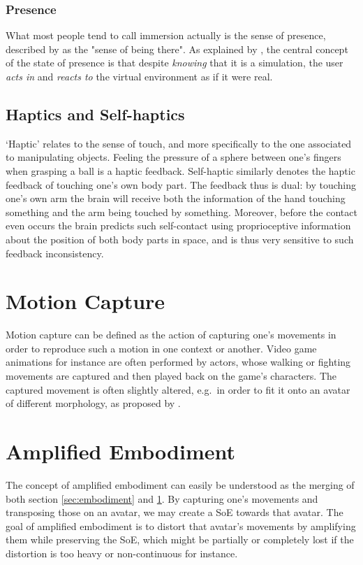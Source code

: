 \subsubsection{Presence}
What most people tend to call immersion actually is the sense of presence, described by \cite{held1992telepresence,slater1993representations} as the "sense of being there". As explained by \cite{debarba2017embodiment}, the central concept of the state of presence is that despite \textit{knowing} that it is a simulation, the user \textit{acts in} and \textit{reacts to} the virtual environment as if it were real.

\subsection{Haptics and Self-haptics}

`Haptic' relates to the sense of touch, and more specifically to the one associated to manipulating objects. Feeling the pressure of a sphere between one's fingers when grasping a ball is a haptic feedback. Self-haptic similarly denotes the haptic feedback of touching one's own body part. The feedback thus is dual: by touching one's own arm the brain will receive both the information of the hand touching something and the arm being touched by something. Moreover, before the contact even occurs the brain predicts such self-contact using proprioceptive information about the position of both body parts in space, and is thus very sensitive to such feedback inconsistency.

\section{Motion Capture}
\label{sec:mocap}
Motion capture can be defined as the action of capturing one's movements in order to reproduce such a motion in one context or another. Video game animations for instance are often performed by actors, whose walking or fighting movements are captured and then played back on the game's characters. The captured movement is often slightly altered, e.g.\ in order to fit it onto an avatar of different morphology, as proposed by \cite{molla2017egocentric}.

\section{Amplified Embodiment}

The concept of amplified embodiment can easily be understood as the merging of both section \ref{sec:embodiment} and \ref{sec:mocap}. By capturing one's movements and transposing those on an avatar, we may create a SoE towards that avatar. The goal of amplified embodiment is to distort that avatar's movements by amplifying them while preserving the SoE, which might be partially or completely lost if the distortion is too heavy or non-continuous for instance.

